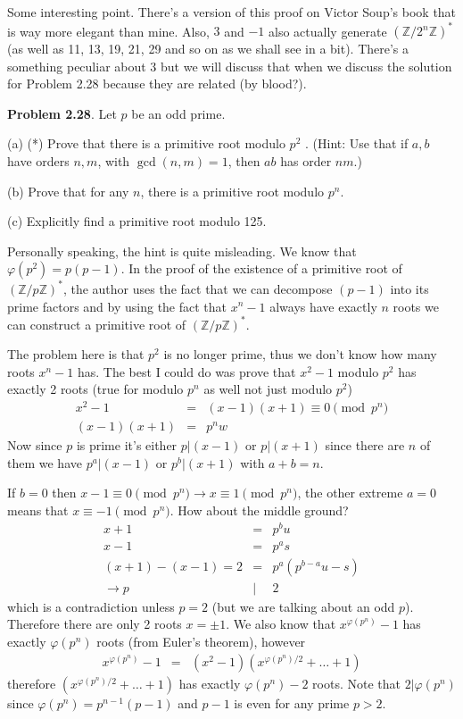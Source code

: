 \documentclass[aps,preprint,preprintnumbers,nofootinbib,showpacs,prd]{revtex4-1}
\newcommand{\nbea}{\begin{eqnarray*}}
\newcommand{\neea}{\end{eqnarray*}}
\begin{document}
Some interesting point. There's a version of this proof on Victor Soup's book that is way more elegant than mine. Also, $3$ and $-1$ also actually generate $(\mathbb{Z}/2^n\mathbb{Z})^*$ (as well as 11, 13, 19, 21, 29 and so on as we shall see in a bit). There's a something peculiar about 3 but we will discuss that when we discuss the solution for Problem 2.28 because they are related (by blood?).

{\bf Problem 2.28}. Let $p$ be an odd prime.

(a) (*) Prove that there is a primitive root modulo $p^2$ . (Hint: Use that if $a, b$ have orders $n, m$, with $\gcd(n, m) = 1$, then $ab$ has order $nm$.)

(b) Prove that for any $n$, there is a primitive root modulo $p^n$.

(c) Explicitly find a primitive root modulo 125.

Personally speaking, the hint is quite misleading. We know that $\varphi(p^2) = p(p-1)$. In the proof of the existence of a primitive root of $(\mathbb{Z}/p\mathbb{Z})^*$, the author uses the fact that we can decompose $(p-1)$ into its prime factors and by using the fact that $x^n-1$ always have exactly $n$ roots we can construct a primitive root of $(\mathbb{Z}/p\mathbb{Z})^*$.

The problem here is that $p^2$ is no longer prime, thus we don't know how many roots $x^n-1$ has. The best I could do was prove that $x^2-1$ modulo $p^2$ has exactly 2 roots (true for modulo $p^n$ as well not just modulo $p^2$)
%
\nbea
x^2-1 & = & (x-1)(x+1) \equiv 0 \pmod{p^n} \\
(x-1)(x+1) & = & p^n w
\neea
%
Now since $p$ is prime it's either $p|(x-1)$ or $p|(x+1)$ since there are $n$ of them we have $p^a|(x-1)$ or $p^b|(x+1)$ with $a+b=n$.

If $b=0$ then $x-1 \equiv 0 \pmod{p^n} \to x \equiv 1 \pmod{p^n}$, the other extreme $a=0$ means that $x \equiv -1 \pmod{p^n}$. How about the middle ground?
%
\nbea
x + 1 & = & p^b u \\
x - 1 & = & p^a s \\
(x+1) - (x-1) = 2 & = & p^a(p^{b-a}u - s) \\
\to p &|& 2
\neea
%
which is a contradiction unless $p=2$ (but we are talking about an odd $p$). Therefore there are only 2 roots $x = \pm 1$. We also know that $x^{\varphi(p^n)}-1$ has exactly $\varphi(p^n)$ roots (from Euler's theorem), however
%
\nbea
x^{\varphi(p^n)}-1 & = & (x^2-1)(x^{\varphi(p^n)/2} + \dots + 1)
\neea
%
therefore $(x^{\varphi(p^n)/2} + \dots + 1)$ has exactly $\varphi(p^n)-2$ roots. Note that $2|\varphi(p^n)$ since $\varphi(p^n) = p^{n-1}(p-1)$ and $p-1$ is even for any prime $p>2$.
\end{document}
